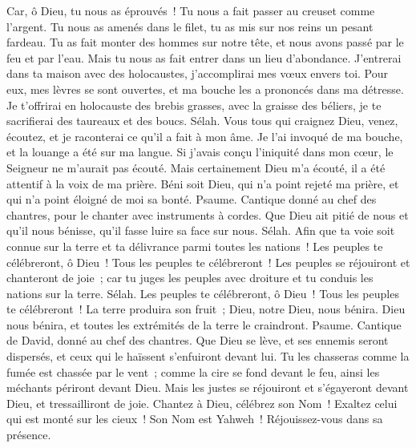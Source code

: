\begin{multicols}{2}
Car, ô Dieu, tu nous as éprouvés~! Tu nous a fait passer au creuset comme l'argent.
Tu nous as amenés dans le filet, tu as mis sur nos reins un pesant fardeau.
Tu as fait monter des hommes sur notre tête, et nous avons passé par le feu et par l'eau. Mais tu nous as fait entrer dans un lieu d'abondance.
J'entrerai dans ta maison avec des holocaustes, j'accomplirai mes vœux envers toi.
Pour eux, mes lèvres se sont ouvertes, et ma bouche les a prononcés dans ma détresse.
Je t'offrirai en holocauste des brebis grasses, avec la graisse des béliers, je te sacrifierai des taureaux et des boucs. Sélah.
Vous tous qui craignez Dieu, venez, écoutez, et je raconterai ce qu'il a fait à mon âme.
Je l'ai invoqué de ma bouche, et la louange a été sur ma langue.
Si j'avais conçu l'iniquité dans mon cœur, le Seigneur ne m'aurait pas écouté.
Mais certainement Dieu m'a écouté, il a été attentif à la voix de ma prière.
Béni soit Dieu, qui n'a point rejeté ma prière, et qui n'a point éloigné de moi sa bonté.
\VerseOne{}Psaume. Cantique donné au chef des chantres, pour le chanter avec instruments à cordes.
Que Dieu ait pitié de nous et qu'il nous bénisse, qu'il fasse luire sa face sur nous. Sélah.
Afin que ta voie soit connue sur la terre et ta délivrance parmi toutes les nations~!
Les peuples te célébreront, ô Dieu~! Tous les peuples te célébreront~!
Les peuples se réjouiront et chanteront de joie~; car tu juges les peuples avec droiture et tu conduis les nations sur la terre. Sélah.
Les peuples te célébreront, ô Dieu~! Tous les peuples te célébreront~!
La terre produira son fruit~; Dieu, notre Dieu, nous bénira.
Dieu nous bénira, et toutes les extrémités de la terre le craindront.
\VerseOne{}Psaume. Cantique de David, donné au chef des chantres.
Que Dieu se lève, et ses ennemis seront dispersés, et ceux qui le haïssent s'enfuiront devant lui.
Tu les chasseras comme la fumée est chassée par le vent~; comme la cire se fond devant le feu, ainsi les méchants périront devant Dieu.
Mais les justes se réjouiront et s'égayeront devant Dieu, et tressailliront de joie.
Chantez à Dieu, célébrez son Nom~! Exaltez celui qui est monté sur les cieux~! Son Nom est Yahweh~! Réjouissez-vous dans sa présence.

\end{multicols}
